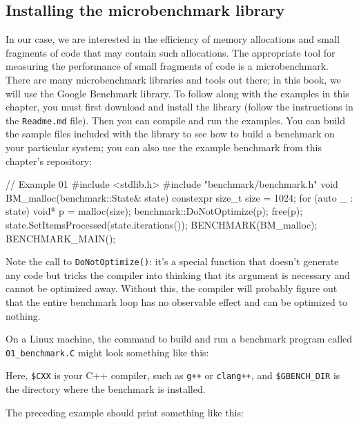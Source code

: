 \subsection{Installing the microbenchmark library}

In our case, we are interested in the efficiency of memory allocations and small fragments of code that may contain such allocations. The appropriate tool for measuring the performance of small fragments of code is a microbenchmark. There are many microbenchmark libraries and tools out there; in this book, we will use the Google Benchmark library. To follow along with the examples in this chapter, you must first download and install the library (follow the instructions in the \texttt{Readme.md} file). Then you can compile and run the examples. You can build the sample files included with the library to see how to build a benchmark on your particular system; you can also use the example benchmark from this chapter's repository:

\begin{code}
// Example 01
#include <stdlib.h>
#include "benchmark/benchmark.h"
void BM_malloc(benchmark::State& state) {
  constexpr size_t size = 1024;
  for (auto _ : state) {
    void* p = malloc(size);
    benchmark::DoNotOptimize(p);
    free(p);
  }
  state.SetItemsProcessed(state.iterations());
}
BENCHMARK(BM_malloc);
BENCHMARK_MAIN();
\end{code}

Note the call to \texttt{DoNotOptimize()}: it's a special function that doesn't generate any code but tricks the compiler into thinking that its argument is necessary and cannot be optimized away. Without this, the compiler will probably figure out that the entire benchmark loop has no observable effect and can be optimized to nothing.

On a Linux machine, the command to build and run a benchmark program called \texttt{01\_benchmark.C} might look something like this:


Here, \texttt{\$CXX} is your C++ compiler, such as \texttt{g++} or \texttt{clang++}, and \texttt{\$GBENCH\_DIR} is the directory where the benchmark is installed.

The preceding example should print something like this:

